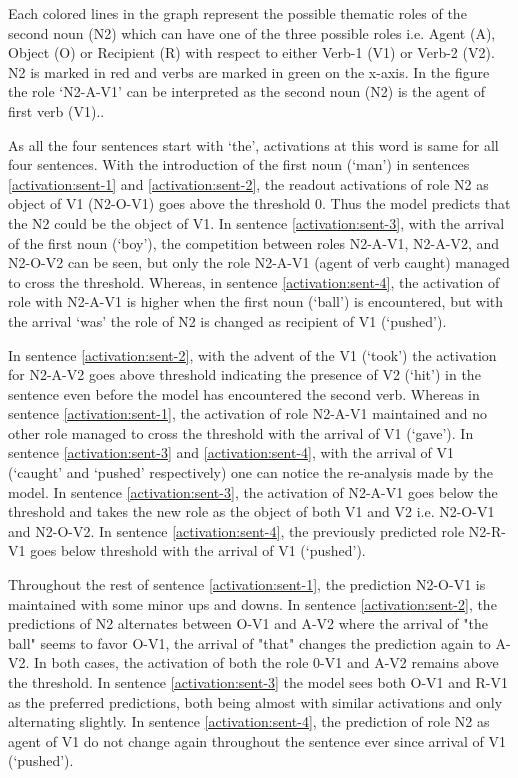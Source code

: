 Each colored lines in the graph represent the possible thematic roles of the second noun (N2) which can have one of the three possible roles i.e. Agent (A), Object (O) or Recipient (R) with respect to either Verb-1 (V1) or Verb-2 (V2). N2 is marked in red and verbs are marked in green on the x-axis. In the figure the role `N2-A-V1' can be interpreted as the second noun (N2) is the agent of first verb (V1).. 

As all the four sentences start with `the', activations at this word is same for all four sentences. With the introduction of the first noun (`man') in sentences \ref{activation:sent-1} and \ref{activation:sent-2}, the readout activations of role N2 as object of V1 (N2-O-V1) goes above the threshold 0. Thus the model predicts that the N2 could be the object of V1. In sentence \ref{activation:sent-3}, with the arrival of the first noun (`boy'), the competition between roles N2-A-V1, N2-A-V2, and N2-O-V2 can be seen, but only the role N2-A-V1 (agent of verb caught) managed to cross the threshold. Whereas, in sentence \ref{activation:sent-4}, the activation of role with N2-A-V1 is higher when the first noun (`ball') is encountered, but with the arrival `was' the role of N2 is changed as recipient of V1 (`pushed').

In sentence \ref{activation:sent-2}, with the advent of the V1 (`took') the activation for N2-A-V2 goes above threshold indicating the presence of V2 (`hit') in the sentence even before the model has encountered the second verb. Whereas in sentence \ref{activation:sent-1}, the activation of role N2-A-V1 maintained and no other role managed to cross the threshold with the arrival of V1 (`gave'). In sentence \ref{activation:sent-3} and \ref{activation:sent-4}, with the arrival of V1 (`caught' and `pushed' respectively) one can notice the re-analysis made by the model. In sentence \ref{activation:sent-3}, the activation of N2-A-V1 goes below the threshold and takes the new role as the object of both V1 and V2 i.e. N2-O-V1 and N2-O-V2. In sentence \ref{activation:sent-4}, the previously predicted role N2-R-V1 goes below threshold with the arrival of V1 (`pushed').

Throughout the rest of sentence \ref{activation:sent-1}, the prediction N2-O-V1 is maintained with some minor ups and downs. In sentence \ref{activation:sent-2}, the predictions of N2 alternates between O-V1 and A-V2 where the arrival of "the ball" seems to favor O-V1, the arrival of "that" changes the prediction again to A-V2. In both cases, the activation of both the role 0-V1 and A-V2 remains above the threshold. In sentence \ref{activation:sent-3} the model sees both O-V1 and R-V1 as the preferred predictions, both being almost with similar activations and only alternating slightly. In sentence \ref{activation:sent-4}, the prediction of role N2 as agent of V1 do not change again throughout the sentence ever since arrival of V1 (`pushed').


